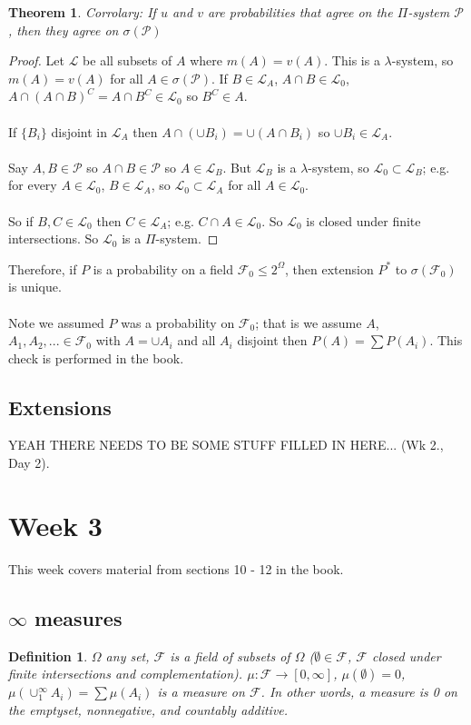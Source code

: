 \documentclass[12pt]{article}
\newtheorem{theorem}{Theorem}
\newtheorem{defn}{Definition}
\begin{document}
\begin{theorem}
Corrolary: If $u$ and $v$ are probabilities that agree on the $\Pi$-system $\mathcal{P}$, then they agree on $\sigma(\mathcal{P})$
\end{theorem}
\begin{proof}
Let $\mathcal{L}$ be all subsets of $A$ where $m(A) = v(A)$.  This is a $\lambda$-system, so $m(A) = v(A)$ for all $A \in \sigma(\mathcal{P})$.  If $B \in \mathcal{L}_A$, $A \cap B \in \mathcal{L}_0$, $A \cap (A \cap B)^C = A \cap B^C \in \mathcal{L}_0$ so $B^C \in A$.
\\ \\
If $\{B_i\}$ disjoint in $\mathcal{L}_A$ then $A \cap (\cup B_i) = \cup(A \cap B_i)$ so $\cup B_i \in \mathcal{L}_A$.
\\ \\
Say $A, B \in \mathcal{P}$ so $A \cap B \in \mathcal{P}$ so $A \in \mathcal{L}_B$.  But $\mathcal{L}_B$ is a $\lambda$-system, so $\mathcal{L}_0 \subset \mathcal{L}_B$; e.g. for every $A \in \mathcal{L}_0$, $B \in \mathcal{L}_A$, so $\mathcal{L}_0 \subset \mathcal{L}_A$ for all $A \in \mathcal{L}_0$.
\\ \\
So if $B, C \in \mathcal{L}_0$ then $C \in \mathcal{L}_A$; e.g. $C \cap A \in \mathcal{L}_0$.  So $\mathcal{L}_0$ is closed under finite intersections.  So $\mathcal{L}_0$ is a $\Pi$-system.
\end{proof}

Therefore, if $P$ is a probability on a field $\mathcal{F}_0 \le 2^\Omega$, then extension $P^*$ to $\sigma( \mathcal{F}_0)$ is unique.
\\ \\
Note we assumed $P$ was a probability on $\mathcal{F}_0$; that is we assume $A$, $A_1, A_2, ...\in \mathcal{F}_0$ with $A = \cup A_i$ and all $A_i$ disjoint then $P(A) = \sum P(A_i)$.  This check is performed in the book.

\subsection{Extensions}
YEAH THERE NEEDS TO BE SOME STUFF FILLED IN HERE... (Wk 2., Day 2).

\section{Week 3}
This week covers material from sections 10 - 12 in the book.

\subsection{$\infty$ measures}
\begin{defn}
$\Omega$ any set, $\mathcal{F}$ is a field of subsets of $\Omega$ ($\emptyset \in \mathcal{F}$, $\mathcal{F}$ closed under finite intersections and complementation).  $\mu: \mathcal{F} \rightarrow [0, \infty]$, $\mu(\emptyset) = 0$, $\mu(\cup_1^\infty A_i) = \sum \mu(A_i)$ is a measure on $\mathcal{F}$.  In other words, a measure is 0 on the emptyset, nonnegative, and countably additive.
\end{defn}
\end{document}
